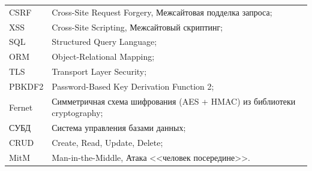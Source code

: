 
\noindent
\begin{tabular}{@{}p{2.4cm}@{\ \mdash\ }p{12.2cm}@{}}
CSRF & Cross-Site Request Forgery, Межсайтовая подделка запроса;\\
XSS & Cross-Site Scripting, Межсайтовый скриптинг;\\
SQL & Structured Query Language;\\
ORM & Object-Relational Mapping;\\
TLS & Transport Layer Security;\\
PBKDF2 & Password-Based Key Derivation Function 2;\\
Fernet & Симметричная схема шифрования (AES + HMAC) из библиотеки cryptography;\\
СУБД & Система управления базами данных;\\
CRUD & Create, Read, Update, Delete;\\
MitM & Man-in-the-Middle, Атака <<человек посередине>>.
\end{tabular}
